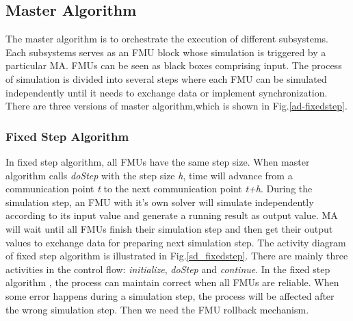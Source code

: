 \subsection{Master Algorithm}
The master algorithm is to orchestrate the execution of different subsystems. Each subsystems serves as an FMU block whose simulation is triggered by a particular MA. FMUs can be seen as black boxes comprising input. The process of simulation is divided into several steps where each FMU can be simulated independently until it needs to exchange data or implement synchronization. There are three versions of master algorithm,which is shown in Fig.\ref{ad-fixedstep}.
\begin{figure}[htbp]
\end{figure}
\subsubsection{Fixed Step Algorithm}
In fixed step algorithm, all FMUs have the same step size. When master algorithm calls \emph{doStep} with the step size \emph{h}, time will advance from a communication point \emph{t} to the next communication point \emph{t+h}. During the simulation step, an FMU with it's own solver will simulate independently according to its input value and generate a running result as output value. MA will wait until all FMUs finish their simulation step and then get their output values to exchange data for preparing next simulation step. The activity diagram of fixed step algorithm is illustrated in Fig.\ref{sd_fixedstep}. There are mainly three activities in the control flow: \emph{initialize}, \emph{doStep} and \emph{continue}. In the fixed step algorithm \cite{BromanBGLMTW13}, the process can maintain correct when all FMUs are reliable. When some error happens during a simulation step, the process will be affected after the wrong simulation step. Then we need the FMU rollback mechanism.
